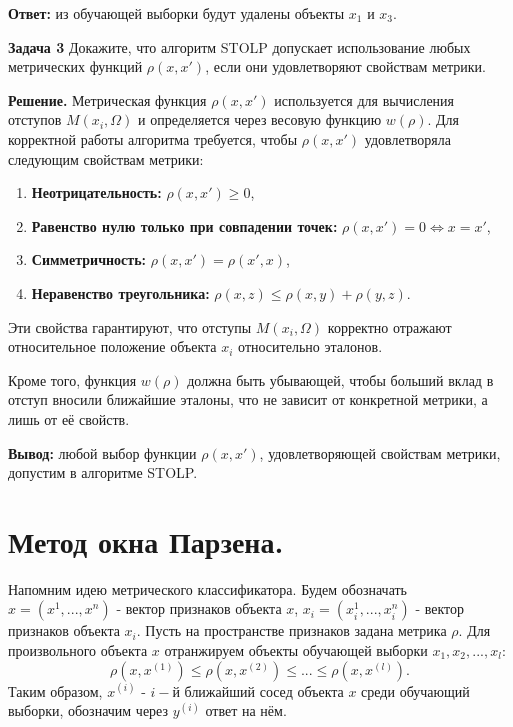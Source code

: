\textbf{Ответ:} из обучающей выборки будут удалены объекты \(x_1\) и \(x_3\).

\textbf{Задача 3}
Докажите, что алгоритм STOLP допускает использование любых метрических функций \( \rho(x, x') \), если они удовлетворяют свойствам метрики.

\textbf{Решение.}  
Метрическая функция \( \rho(x, x') \) используется для вычисления отступов \(M(x_i, \Omega)\) и определяется через весовую функцию \(w(\rho)\). Для корректной работы алгоритма требуется, чтобы \( \rho(x, x') \) удовлетворяла следующим свойствам метрики:
\begin{enumerate}
    \item \textbf{Неотрицательность:} \(\rho(x, x') \geq 0\),  
    \item \textbf{Равенство нулю только при совпадении точек:} \(\rho(x, x') = 0 \iff x = x'\),  
    \item \textbf{Симметричность:} \(\rho(x, x') = \rho(x', x)\),  
    \item \textbf{Неравенство треугольника:} \(\rho(x, z) \leq \rho(x, y) + \rho(y, z)\).  
\end{enumerate}

Эти свойства гарантируют, что отступы \(M(x_i, \Omega)\) корректно отражают относительное положение объекта \(x_i\) относительно эталонов.  

Кроме того, функция \(w(\rho)\) должна быть убывающей, чтобы больший вклад в отступ вносили ближайшие эталоны, что не зависит от конкретной метрики, а лишь от её свойств.

\textbf{Вывод:} любой выбор функции \( \rho(x, x') \), удовлетворяющей свойствам метрики, допустим в алгоритме STOLP.

\section{Метод окна Парзена.}

Напомним идею метрического классификатора. Будем обозначать $x = (x^1, ..., x^n)$ - вектор признаков объекта $x$, $x_i = (x_i^1, ..., x_i^n)$ - вектор признаков объекта $x_i$. Пусть на пространстве признаков задана метрика $\rho$. Для произвольного объекта $x$ отранжируем объекты обучающей выборки $x_1, x_2, ..., x_l$:
\begin{equation*}
	\rho(x, x^{(1)}) \le \rho(x, x^{(2)}) \le ... \le \rho(x, x^{(l)}).
\end{equation*}
Таким образом, $x^{(i)}$ - $i-$й ближайший сосед объекта $x$ среди обучающий выборки, обозначим через $y^{(i)}$ ответ на нём. 


